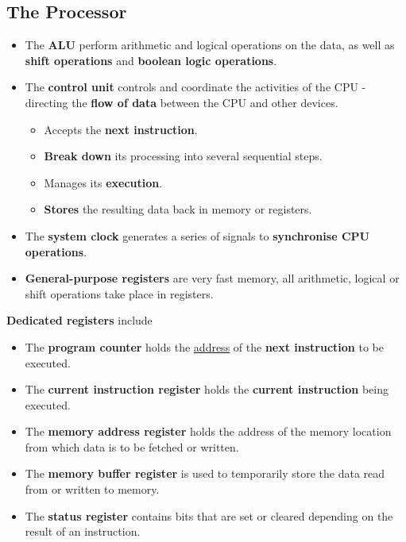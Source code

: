 \subsection{The Processor}

\begin{itemize}
    \item The \textbf{ALU} perform arithmetic and logical operations on the data, as well as \textbf{shift operations} and \textbf{boolean logic operations}.
    \item The \textbf{control unit} controls and coordinate the activities of the CPU - directing the \textbf{flow of data} between the CPU and other devices.
        \begin{itemize}
            \item Accepts the \textbf{next instruction}.
            \item \textbf{Break down} its processing into several sequential steps.
            \item Manages its \textbf{execution}.
            \item \textbf{Stores} the resulting data back in memory or registers.
        \end{itemize}
    \item The \textbf{system clock} generates a series of signals to \textbf{synchronise CPU operations}.
    \item \textbf{General-purpose registers} are very fast memory, all arithmetic, logical or shift operations take place in registers.
\end{itemize}

\textbf{Dedicated registers} include
\begin{itemize}
    \item The \textbf{program counter} holds the \underline{address} of the \textbf{next instruction} to be executed.
    \item The \textbf{current instruction register} holds the \textbf{current instruction} being executed.
    \item The \textbf{memory address register} holds the address of the memory location from which data is to be fetched or written.
    \item The \textbf{memory buffer register} is used to temporarily store the data read from or written to memory.
    \item The \textbf{status register} contains bits that are set or cleared depending on the result of an instruction.
\end{itemize}

